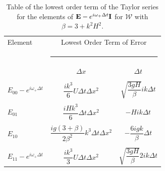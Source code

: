 \begin{table}
	\begin{tabular}{l  c c}
		Element & \multicolumn{2}{c}{Lowest Order Term of Error}\\
		&  \multicolumn{2}{l}{\rule{0.7\textwidth}{0.4pt}} \\
		& $\Delta x$&$\Delta t$\\
		\hline && \\
		$E_{00} -  e^{i \omega_+ \Delta t} $&  $\dfrac{ik^3}{6} U \Delta t \Delta x^2$ & $ \sqrt{\dfrac{3gH}{\beta}} ik \Delta t $ \\ & & \\
		$E_{01}$& $\dfrac{iHk^3}{6} \Delta t \Delta x^2$ &  $-Hi k \Delta t$ \\ & & \\
		$E_{10}$& $ \dfrac{ig \left(3 + \beta\right)}{2\beta^2} k^3\Delta t \Delta x^2$ &  $ -\dfrac{6igk}{\beta} \Delta t$ \\ & & \\
		$E_{11} -  e^{i \omega_+ \Delta t}$& $\dfrac{ik^3}{3} U \Delta t \Delta x^2$ & $ \sqrt{\dfrac{3gH}{\beta}} 2ik \Delta t $ \\ 
	\end{tabular}
	\caption{Table of the lowest order term of the Taylor series for the elements of $\mathbf{E} - e^{i \omega_+ \Delta t} \mathbf{I}$ for $\mathcal{W}$ with $\beta = 3 + k^2 H^2$.}
	\label{tab:EerrW} 
\end{table}




